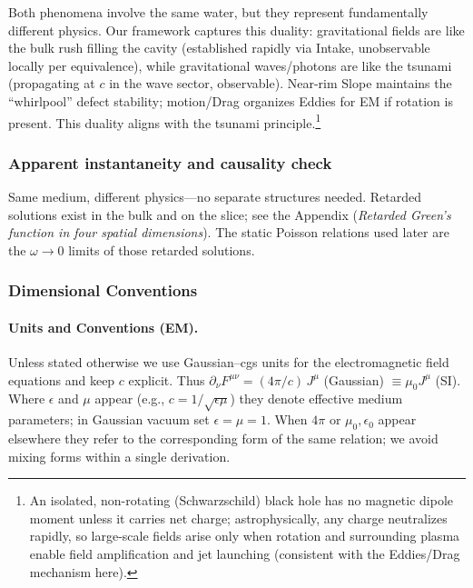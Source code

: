 Both phenomena involve the same water, but they represent fundamentally different physics. Our framework captures this duality: gravitational fields are like the bulk rush filling the cavity (established rapidly via Intake, unobservable locally per equivalence), while gravitational waves/photons are like the tsunami (propagating at $c$ in the wave sector, observable). Near-rim Slope maintains the ``whirlpool'' defect stability; motion/Drag organizes Eddies for EM if rotation is present. This duality aligns with the tsunami principle.\footnote{An isolated, non-rotating (Schwarzschild) black hole has no magnetic dipole moment unless it carries net charge; astrophysically, any charge neutralizes rapidly, so large-scale fields arise only when rotation and surrounding plasma enable field amplification and jet launching (consistent with the Eddies/Drag mechanism here).}

\subsubsection{Apparent instantaneity and causality check}\label{sec:tsunami-causality}

Same medium, different physics---no separate structures needed. Retarded solutions exist in the bulk and on the slice; see the Appendix (\emph{Retarded Green's function in four spatial dimensions}). The static Poisson relations used later are the $\omega\to0$ limits of those retarded solutions.

\medskip
{}

\subsubsection{Dimensional Conventions}
\paragraph{Units and Conventions (EM).} Unless stated otherwise we use Gaussian--cgs units for the electromagnetic field equations and keep $c$ explicit. Thus $\partial_\nu F^{\mu\nu} = (4\pi/c)\, J^\mu$ (Gaussian) $\equiv \mu_0 J^\mu$ (SI). Where $\epsilon$ and $\mu$ appear (e.g., $c = 1/\sqrt{\epsilon\mu}$) they denote effective medium parameters; in Gaussian vacuum set $\epsilon=\mu=1$. When $4\pi$ or $\mu_0,\epsilon_0$ appear elsewhere they refer to the corresponding form of the same relation; we avoid mixing forms within a single derivation.

